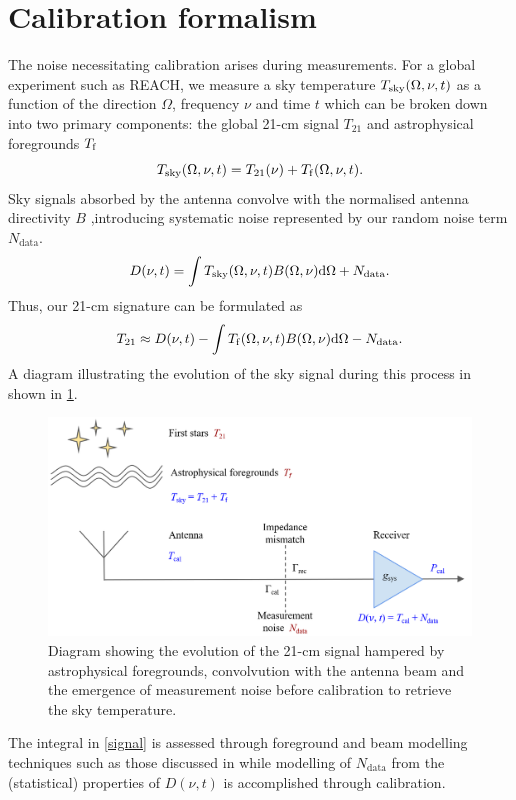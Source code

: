 \section{Calibration formalism}\label{sec:formalism}
The noise necessitating calibration arises during measurements. For a global experiment such as REACH, we measure a sky temperature $T_{\mathrm{sky}}(\Omega, \nu, t)$ as a function of the direction $\Omega$, frequency $\nu$ and time $t$ which can be broken down into two primary components: the global 21-cm signal $T_{21}$ and astrophysical foregrounds $T_{\mathrm{f}}$
\begin{equation}
    \label{tsky}
    T_{\mathrm{sky}}(\Omega, \nu, t) = T_{21}(\nu) + T_{\mathrm{f}}(\Omega, \nu, t).
\end{equation}
Sky signals absorbed by the antenna convolve with the normalised antenna directivity $B$ ,introducing systematic noise represented by our random noise term $N_{\mathrm{data}}$.
\begin{equation}\label{eqn:bayestsource}
    D(\nu, t) = \int T_{\mathrm{sky}}(\Omega, \nu, t) B(\Omega, \nu)\mathrm{d}\Omega + N_{\mathrm{data}}.
\end{equation}
Thus, our 21-cm signature can be formulated as
\begin{equation}\label{signal}
  T_{21} \approx D(\nu, t) - \int T_{\mathrm{f}}(\Omega, \nu, t)B(\Omega, \nu)\mathrm{d}\Omega - N_{\mathrm{data}}.
\end{equation}
A diagram illustrating the evolution of the sky signal during this process in shown in \cref{fig:nsfig}.
\begin{figure}
    \centering
    \includegraphics[width=.7\textwidth]{nsdiag}
    \caption{Diagram showing the evolution of the 21-cm signal hampered by astrophysical foregrounds, convolvution with the antenna beam and the emergence of measurement noise before calibration to retrieve the sky temperature.}
    \label{fig:nsfig}
\end{figure}
The integral in \cref{signal} is assessed through foreground and beam modelling techniques such as those discussed in \citet{dom} while modelling of $N_{\mathrm{data}}$ from the (statistical) properties of $D(\nu, t)$ is accomplished through calibration.


